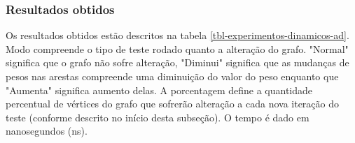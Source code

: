 \subsubsection{Resultados obtidos}
\label{sec-experimentos-dinamicos-ad-resultados}

Os resultados obtidos estão descritos na tabela \ref{tbl-experimentos-dinamicos-ad}. Modo compreende o tipo de teste rodado quanto a alteração do grafo. "Normal" significa que o grafo não sofre alteração, "Diminui" significa que as mudanças de pesos nas arestas compreende uma diminuição do valor do peso enquanto que "Aumenta" significa aumento delas. A porcentagem define a quantidade percentual de vértices do grafo que sofrerão alteração a cada nova iteração do teste (conforme descrito no início desta subseção). O tempo é dado em nanosegundos (ns).

